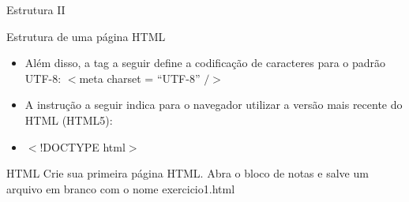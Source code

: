 \documentclass{beamer}
\begin{document}
\begin{frame}{Estrutura II}
  \begin{block}{Estrutura de uma página HTML}
   \begin{itemize}
    \item Além disso, a tag a seguir define a codificação de caracteres 
para o padrão UTF-8: $<$meta charset = “UTF-8” $/>$ \\
   \item A instrução a seguir indica para o navegador utilizar a versão 
mais recente do HTML (HTML5):
  \item $<$!DOCTYPE html$>$
  \end{itemize}
  \end{block}
\end{frame}
\begin{frame}{HTML}
  Crie sua primeira página HTML. Abra o bloco de notas e salve um arquivo em 
branco com o nome exercicio1.html

  \begin{center}
    
  \end{center}
\end{frame}
\end{document}
